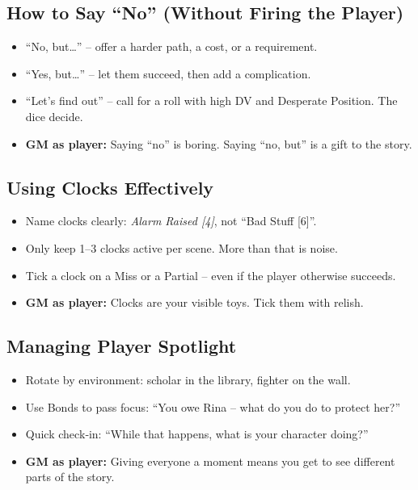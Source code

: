 \subsection*{How to Say “No” (Without Firing the Player)}
\begin{itemize}
  \item “No, but…” – offer a harder path, a cost, or a requirement.
  \item “Yes, but…” – let them succeed, then add a complication.
  \item “Let’s find out” – call for a roll with high DV and Desperate Position. The dice decide.
  \item \textbf{GM as player:} Saying “no” is boring. Saying “no, but” is a gift to the story.
\end{itemize}

\subsection*{Using Clocks Effectively}
\begin{itemize}
  \item Name clocks clearly: \emph{Alarm Raised [4]}, not “Bad Stuff [6]”.
  \item Only keep 1–3 clocks active per scene. More than that is noise.
  \item Tick a clock on a Miss or a Partial – even if the player otherwise succeeds.
  \item \textbf{GM as player:} Clocks are your visible toys. Tick them with relish.
\end{itemize}

\subsection*{Managing Player Spotlight}
\begin{itemize}
  \item Rotate by environment: scholar in the library, fighter on the wall.
  \item Use Bonds to pass focus: “You owe Rina – what do you do to protect her?”
  \item Quick check‑in: “While that happens, what is your character doing?”
  \item \textbf{GM as player:} Giving everyone a moment means you get to see different parts of the story.
\end{itemize}


